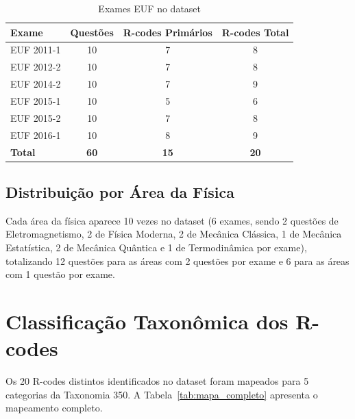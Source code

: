 \documentclass[12pt,a4paper]{article}
\begin{document}
\begin{table}[H]
\centering
\caption{Exames EUF no dataset}
\label{tab:exames}
\begin{tabular}{lccc}
\toprule
\textbf{Exame} & \textbf{Questões} & \textbf{R-codes Primários} & \textbf{R-codes Total} \\
\midrule
EUF 2011-1 & 10 & 7 & 8 \\
EUF 2012-2 & 10 & 7 & 8 \\
EUF 2014-2 & 10 & 7 & 9 \\
EUF 2015-1 & 10 & 5 & 6 \\
EUF 2015-2 & 10 & 7 & 8 \\
EUF 2016-1 & 10 & 8 & 9 \\
\midrule
\textbf{Total} & \textbf{60} & \textbf{15} & \textbf{20} \\
\bottomrule
\end{tabular}
\end{table}

\subsection{Distribuição por Área da Física}

Cada área da física aparece 10 vezes no dataset (6 exames, sendo 2 questões
de Eletromagnetismo, 2 de Física Moderna, 2 de Mecânica Clássica, 1 de
Mecânica Estatística, 2 de Mecânica Quântica e 1 de Termodinâmica por
exame), totalizando 12 questões para as áreas com 2 questões por exame
e 6 para as áreas com 1 questão por exame.

\section{Classificação Taxonômica dos R-codes}

Os 20 R-codes distintos identificados no dataset foram mapeados para
5 categorias da Taxonomia 350. A Tabela~\ref{tab:mapa_completo}
apresenta o mapeamento completo.
\end{document}
